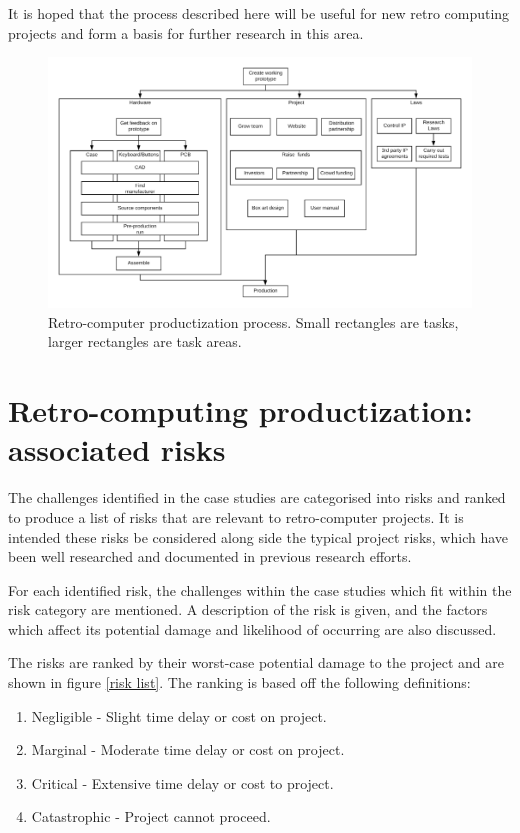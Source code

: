 It is hoped that the process described here will be useful for new retro computing projects and form a basis for further research in this area. \\

\begin{figure} \begin{center}
\includegraphics[width= 1\linewidth]{pics/case_study_process} 
\end{center} 
\caption{Retro-computer productization process. Small rectangles are tasks, larger rectangles are task areas.}
\label{case_study_process}
\end{figure} 

\section{Retro-computing productization: associated risks}
\label{sec: Retro-computing risks}
The challenges identified in the case studies are categorised into risks and ranked to produce a list of risks that are relevant to retro-computer projects. It is intended these risks be considered along side the typical project risks, which have been well researched and documented in previous research efforts. 

For each identified risk, the challenges within the case studies which fit within the risk category are mentioned. A description of the risk is given, and the factors which affect its potential damage and likelihood of occurring are also discussed.

The risks are ranked by their worst-case potential damage to the project and are shown in figure \ref{risk list}. The ranking is based off the following definitions:
\begin{enumerate}
\item Negligible 	- Slight time delay or cost on project.
\item Marginal 		- Moderate time delay or cost on project. 
\item Critical 		- Extensive time delay or cost to project.
\item Catastrophic 	- Project cannot proceed.
\end{enumerate}

